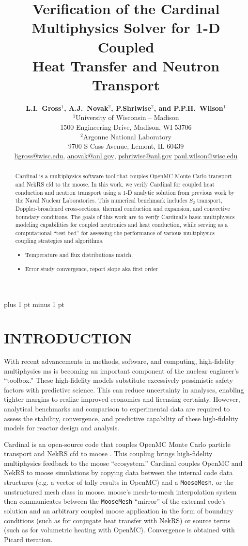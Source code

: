 \documentclass[letterpaper]{mc2023}
\title{Verification of the Cardinal Multiphysics Solver for 1-D Coupled\\
Heat Transfer and Neutron Transport}
\author{%
  \textbf{L.I.~Gross$^1$, A.J.~Novak$^2$, P.Shriwise$^2$, and P.P.H.~Wilson$^1$}\\
  $^1$University of Wisconsin -- Madison  \\
  1500 Engineering Drive, Madison, WI 53706 \vspace{6pt}\\
  $^2$Argonne National Laboratory \\
  9700 S Cass Avenue, Lemont, IL 60439\vspace{6pt} \\
  \url{ligross@wisc.edu}, \url{anovak@anl.gov}, \url{pshriwise@anl.gov} \url{paul.wilson@wisc.edu}
}
\begin{document}
\maketitle
\justify
\parskip 6pt plus 1 pt minus 1 pt

\begin{abstract}
  Cardinal is a multiphysics software tool that couples OpenMC Monte Carlo transport and NekRS \gls{cfd} to the \gls{moose}.
  In this work, we verify Cardinal for coupled heat conduction and neutron transport using a 1-D analytic solution from previous
  work by the Naval Nuclear Laboratories. This numerical benchmark includes $S_2$ transport, Doppler-broadened cross-sections,
  thermal conduction and expansion, and convective boundary conditions. The goals of this work are to verify Cardinal's basic
  multiphysics modeling capabilities for coupled neutronics and heat conduction, while serving as a computational ``test bed''
  for assessing the performance of various multiphysics coupling strategies and algorithms.
  \begin{itemize}
      \item Temperature and flux distributions match.
      \item Error study convergence, report slope aka first order
  \end{itemize}
\end{abstract}
\vspace{6pt}

\section{INTRODUCTION}
\label{sec:intro}
With recent advancements in methods, software, and computing, high-fidelity multiphysics \gls{ms} is becoming an important
component of the nuclear engineer's ``toolbox.'' These high-fidelity models substitute excessively pessimistic safety factors
with predictive science. This can reduce uncertainty in analyses, enabling tighter margins to realize improved economics
and licensing certainty. However, analytical benchmarks and comparison to experimental data are required to assess the stability,
convergence, and predictive capability of these high-fidelity models for reactor design and analysis.

Cardinal \cite{novak2022_cardinal} is an open-source code  that couples OpenMC \cite{openmc} Monte Carlo particle transport and
NekRS \gls{cfd} to \gls{moose} \cite{lindsay2022moose}. This coupling brings high-fidelity multiphysics feedback to the \gls{moose}
``ecosystem.'' Cardinal couples OpenMC and NekRS to \gls{moose} simulations by copying data between the internal code data structures
(e.g. a vector of tally results in OpenMC) and a \texttt{MooseMesh}, or the unstructured mesh class in \gls{moose}. \gls{moose}'s
mesh-to-mesh interpolation system then communicates between the \texttt{MooseMesh} ``mirror'' of the external code's solution and an
arbitrary coupled \gls{moose} application in the form of boundary conditions (such as for conjugate heat transfer with NekRS) or
source terms (such as for volumetric heating with OpenMC). Convergence is obtained with Picard iteration.
\end{document}
